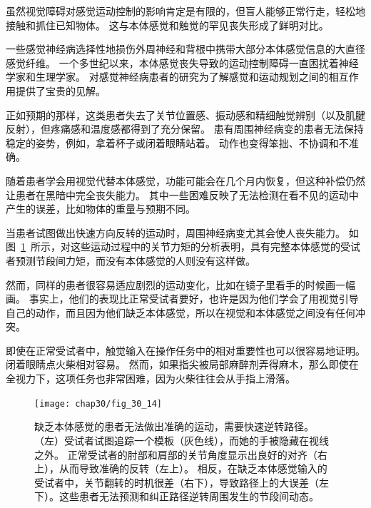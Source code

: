 \begin{proposition}[本体感觉和触觉对感觉运动控制至关重要] \label{box:30_3}
	
	\quad \quad 虽然视觉障碍对感觉运动控制的影响肯定是有限的，但盲人能够正常行走，轻松地接触和抓住已知物体。
	这与本体感觉和触觉的罕见丧失形成了鲜明对比。
	
	\quad \quad 一些感觉神经病选择性地损伤外周神经和背根中携带大部分本体感觉信息的大直径感觉纤维。
	一个多世纪以来，本体感觉丧失导致的运动控制障碍一直困扰着神经学家和生理学家。
	对感觉神经病患者的研究为了解感觉和运动规划之间的相互作用提供了宝贵的见解。
	
	\quad \quad 正如预期的那样，这类患者失去了关节位置感、振动感和精细触觉辨别（以及肌腱反射），但疼痛感和温度感都得到了充分保留。
	患有周围神经病变的患者无法保持稳定的姿势，例如，拿着杯子或闭着眼睛站着。
	动作也变得笨拙、不协调和不准确。
	
	\quad \quad 随着患者学会用视觉代替本体感觉，功能可能会在几个月内恢复，但这种补偿仍然让患者在黑暗中完全丧失能力。
	其中一些困难反映了无法检测在看不见的运动中产生的误差，比如物体的重量与预期不同。
	
	\quad \quad 当患者试图做出快速方向反转的运动时，周围神经病变尤其会使人丧失能力。
	如图~\ref{fig:30_14}~所示，对这些运动过程中的关节力矩的分析表明，具有完整本体感觉的受试者预测节段间力矩，而没有本体感觉的人则没有这样做。
	
	\quad \quad 然而，同样的患者很容易适应剧烈的运动变化，比如在镜子里看手的时候画一幅画。
	事实上，他们的表现比正常受试者要好，也许是因为他们学会了用视觉引导自己的动作，而且因为他们缺乏本体感觉，所以在视觉和本体感觉之间没有任何冲突。
	
	\quad \quad 即使在正常受试者中，触觉输入在操作任务中的相对重要性也可以很容易地证明。
	闭着眼睛点火柴相对容易。
	然而，如果指尖被局部麻醉剂弄得麻木，那么即使在全视力下，这项任务也非常困难，因为火柴往往会从手指上滑落。
	
\end{proposition}


\begin{figure}[htbp]
	\centering
	\texttt{[image: chap30/fig\_30\_14]}
	\caption{缺乏本体感觉的患者无法做出准确的运动，需要快速逆转路径。
		（左）受试者试图追踪一个模板（灰色线），而她的手被隐藏在视线之外。
		正常受试者的肘部和肩部的关节角度显示出良好的对齐（右上），从而导致准确的反转（左上）。
		相反，在缺乏本体感觉输入的受试者中，关节翻转的时机很差（右下），导致路径上的大误差（左下）。这些患者无法预测和纠正路径逆转周围发生的节段间动态。}
	\label{fig:30_14}
\end{figure}


